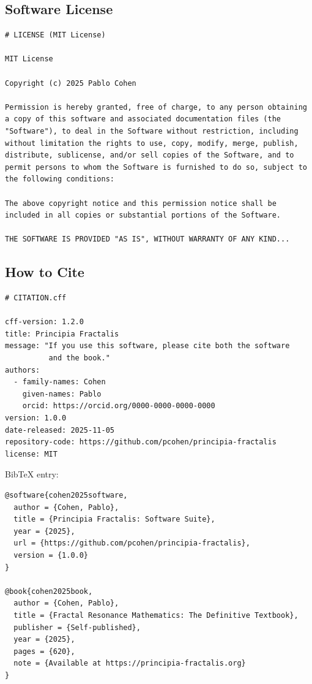 \subsection{Software License}

\begin{verbatim}
# LICENSE (MIT License)

MIT License

Copyright (c) 2025 Pablo Cohen

Permission is hereby granted, free of charge, to any person obtaining
a copy of this software and associated documentation files (the
"Software"), to deal in the Software without restriction, including
without limitation the rights to use, copy, modify, merge, publish,
distribute, sublicense, and/or sell copies of the Software, and to
permit persons to whom the Software is furnished to do so, subject to
the following conditions:

The above copyright notice and this permission notice shall be
included in all copies or substantial portions of the Software.

THE SOFTWARE IS PROVIDED "AS IS", WITHOUT WARRANTY OF ANY KIND...
\end{verbatim}

\subsection{How to Cite}

\begin{verbatim}
# CITATION.cff

cff-version: 1.2.0
title: Principia Fractalis
message: "If you use this software, please cite both the software
          and the book."
authors:
  - family-names: Cohen
    given-names: Pablo
    orcid: https://orcid.org/0000-0000-0000-0000
version: 1.0.0
date-released: 2025-11-05
repository-code: https://github.com/pcohen/principia-fractalis
license: MIT
\end{verbatim}

BibTeX entry:
\begin{verbatim}
@software{cohen2025software,
  author = {Cohen, Pablo},
  title = {Principia Fractalis: Software Suite},
  year = {2025},
  url = {https://github.com/pcohen/principia-fractalis},
  version = {1.0.0}
}

@book{cohen2025book,
  author = {Cohen, Pablo},
  title = {Fractal Resonance Mathematics: The Definitive Textbook},
  publisher = {Self-published},
  year = {2025},
  pages = {620},
  note = {Available at https://principia-fractalis.org}
}
\end{verbatim}

